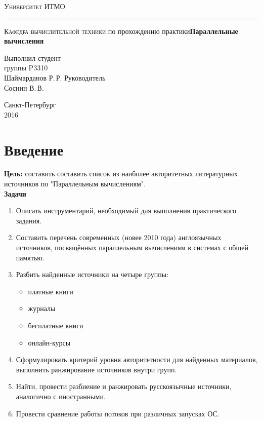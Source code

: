 \documentclass{article}
\author{Шаймарданов123 Р. Р.}
\begin{document}
\begin{titlepage}
	\begin{center}
		{\large\textsc{Университет ИТМО}}
		\vskip 1pt \hrule \vskip 3pt
		{\large\textsc{Кафедра вычислительной техники}}
		\vfill
		{ по прохождению практики\vskip 12pt\bfseries Параллельные вычисления}	
	\end{center}
	\vfill	
	\begin{flushright}
		{Выполнил студент\\группы P3310\\Шаймарданов Р.\,Р.\vskip 12pt Руководитель\\Соснин В.\,В.}
	\end{flushright}	
	\vfill	
	\begin{center}
		Санкт-Петербург\\2016
	\end{center}
\end{titlepage}

\tableofcontents
\newpage

\section{Введение}
	\textbf{Цель:} составить составить список из наиболее авторитетных литературных источников по "Параллельным вычислениям".\\
	
	\textbf{Задачи}
	\begin{enumerate}
		\item Описать инструментарий, необходимый для выполнения практического задания.
   		\item Составить перечень современных (новее 2010 года) англоязычных источников, посвящённых параллельным вычислениям в системах с общей памятью.
   		\item Разбить найденные источники на четыре группы: 
   			\begin{itemize}
   		   		\item платные книги 
   		   		\item журналы 
   		   		\item бесплатные книги
   		   		\item онлайн-курсы
   		   	\end{itemize}
   		\item Сформулировать критерий уровня авторитетности для найденных материалов, выполнить ранжирование источников внутри групп.
   		\item Найти, провести разбиение и ранжировать русскоязычные источники, аналогично с иностранными. 
   		\item Провести сравнение работы потоков при различных запусках ОС.
	\end{enumerate}
\newpage
\end{document}
